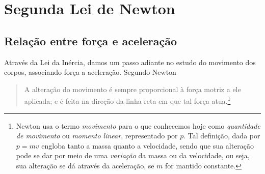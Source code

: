 % 
\section{Segunda Lei de Newton}
\subsection{Relação entre força e aceleração}

Através da Lei da Inércia, damos um passo adiante no estudo do movimento dos corpos, associando força a aceleração. Segundo Newton
\begin{quote}
  A alteração do movimento é sempre proporcional à força motriz a ele aplicada; e é feita na direção da linha reta em que tal força atua.\footnote{Newton usa o termo \emph{movimento} para o que conhecemos hoje como \emph{quantidade de movimento} ou \emph{momento linear}, representado por $p$. Tal definição, dada por $p = mv$ engloba tanto a massa quanto a velocidade, sendo que sua alteração pode se dar por meio de uma \emph{variação} da massa ou da velocidade, ou seja, sua alteração se dá através da aceleração, se $m$ for mantido constante.}
\end{quote}
%

